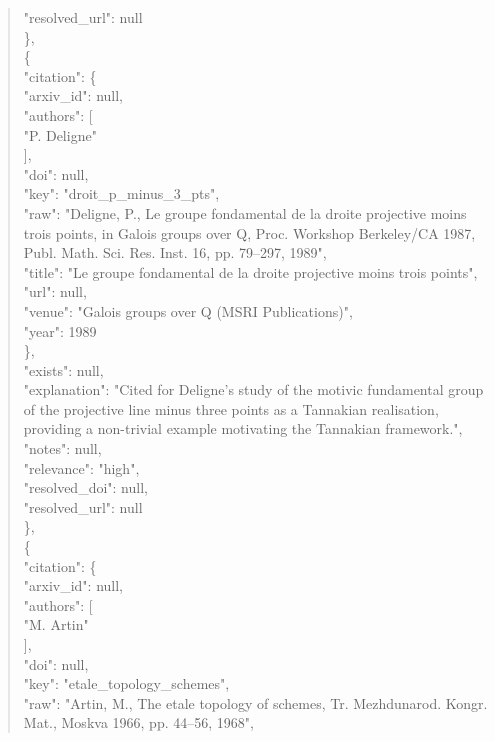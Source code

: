 \documentclass[11pt]{article}
\begin{document}
\begin{quote}
      "resolved\_url": null\\
    \},\\
    \{\\
      "citation": \{\\
        "arxiv\_id": null,\\
        "authors": [\\
          "P. Deligne"\\
        ],\\
        "doi": null,\\
        "key": "droit\_p\_minus\_3\_pts",\\
        "raw": "Deligne, P., Le groupe fondamental de la droite projective moins trois points, in Galois groups over Q, Proc. Workshop Berkeley/CA 1987, Publ. Math. Sci. Res. Inst. 16, pp. 79--297, 1989",\\
        "title": "Le groupe fondamental de la droite projective moins trois points",\\
        "url": null,\\
        "venue": "Galois groups over Q (MSRI Publications)",\\
        "year": 1989\\
      \},\\
      "exists": null,\\
      "explanation": "Cited for Deligne's study of the motivic fundamental group of the projective line minus three points as a Tannakian realisation, providing a non-trivial example motivating the Tannakian framework.",\\
      "notes": null,\\
      "relevance": "high",\\
      "resolved\_doi": null,\\
      "resolved\_url": null\\
    \},\\
    \{\\
      "citation": \{\\
        "arxiv\_id": null,\\
        "authors": [\\
          "M. Artin"\\
        ],\\
        "doi": null,\\
        "key": "etale\_topology\_schemes",\\
        "raw": "Artin, M., The etale topology of schemes, Tr. Mezhdunarod. Kongr. Mat., Moskva 1966, pp. 44--56, 1968",\\

\end{quote}
\end{document}
